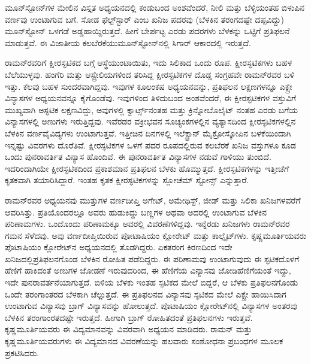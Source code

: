ಮೂನ್‍ಸ್ಟೋನ್‍ಗಳ ಮೇಲಿನ ವಿಸ್ತೃತ ಅಧ್ಯಯನದಲ್ಲಿ ಕಂಡುಬಂದ ಅಂಶವೆಂದರೆ, ನೀಲಿ ಮತ್ತು ಬೆಳ್ಳಿಯಂತಹ ಬಿಳುಪಿನ ವರ್ಣವು ಉಂಟಾಗುವ ಬಗೆ. ಸೋಡ ಫೆಲ್ಟ್‌ಸ್ಟಾರ್ ಎಂಬ ಖನಿಜ ಪದರವು (ಬೆಳಕಿನ ತರಂಗದಷ್ಟೇ ದಪ್ಪವಿದ್ದು) ಮೂನ್‍ಸ್ಟೋನ್ ಒಳಗಡೆ ಅಡ್ಡಹಾಯ್ದಿರುತ್ತದೆ. ಹೀಗೆ ಬೇರ್ಪಟ್ಟ ಎರಡು ಪದರಗಳು ಬೆಳಕನ್ನು ಒಟ್ಟಿಗೆ ಪ್ರತಿಫಲನೆ ಮಾಡುತ್ತವೆ. ಈ ವಿಜಾತೀಯ ಕಲಬೆರಕೆಯು\break ಮೂನ್‍ಸ್ಟೋನ್‍ನಲ್ಲಿ ಸಿಗಾರ್ ಆಕಾರದಲ್ಲಿ ಇರುತ್ತದೆ.

ರಾಮನ್‍ರವರಿಗೆ ಕ್ಷೀರಸ್ಫಟಿಕದ ಬಗ್ಗೆ ಆಸ್ಥೆಯುಂಟಾಯಿತು, ಇದು ಸಿಲಿಕಾದ ಒಂದು ರೂಪ. ಕ್ಷೀರಸ್ಫಟಿಕಗಳು ಬಹಳ ಬೆಲೆಯುಳ್ಳವು. ಹಂಗೆರಿ ಮತ್ತು ಆಸ್ಟ್ರೇಲಿಯಗಳಿಂದ ತರಿಸಿದ್ದ ಕ್ಷೀರಸ್ಫಟಿಕಗಳ ದೊಡ್ಡ ಸಂಗ್ರಹವೇ ರಾಮನ್‍ರವರ ಬಳಿ ಇತ್ತು. ಕೆಲವು ಬಹಳ ಸುಂದರವಾಗಿದ್ದವು. ಇವುಗಳ ಕೂಲಂಕಷ ಅಧ್ಯಯನವನ್ನು, ಪ್ರತಿಫಲನ ಲಕ್ಷಣಗಳನ್ನೂ ಎಕ್ಸ್ರೇ ವಿನ್ಯಾಸಗಳ ಅಧ್ಯಯನವನ್ನೂ ಕೈಗೊಂಡೆವು. ಇವುಗಳಿಂದ ತಿಳಿದುಬಂದ ಅಂಶವೆಂದರೆ, ಈ ಕ್ಷೀರಸ್ಫಟಿಕಗಳ ವಸ್ತುವಿಗೆ ಮುಖ್ಯವಾಗಿ ಅಸ್ಫಟಿಕ ಲಕ್ಷಣವಿದ್ದು, ಅವುಗಳಲ್ಲಿ ಕ್ವಾರ್ಟ್ಸ್‌ನಂತಹ ಮತ್ತು ಕ್ರಿನ್ನೋಬೊಲೈಟ್ ನಂತಹ ಎರಡು ಬಗೆಯ ವಿನ್ಯಾಸಗಳಲ್ಲಿ ಅಣುಗಳು ಇರುತ್ತಿದ್ದವು. ಇವೆರಡರ ವಕ್ರೀಭವನ ಸೂಚ್ಯಂಕಗಳಲ್ಲಿನ ವ್ಯತ್ಯಾಸದಿಂದ ಕ್ಷೀರಸ್ಫಟಿಕಗಳಲ್ಲಿನ ಬೆಳಕಿನ ವರ್ಣವೈವಿದ್ಯಗಳು ಉಂಟಾಗುತ್ತವೆ. ಇತ್ತೀಚಿನ ದಿನಗಳಲ್ಲಿ ಇಲೆಕ್ಟ್ರಾನ್ ಮೈಕ್ರೋಸ್ಕೋಪಿನ ಬಳಕೆಯಿಂದಾಗಿ ಇನ್ನಷ್ಟು ವಿವರಗಳು ದೊರೆತಿವೆ. ಕ್ಷೀರಸ್ಫಟಿಕಗಳ ಒಳಗೆ ಪದರ ರೂಪದಲ್ಲಿರುವ ಕಲಬೆರಕೆ ಖನಿಜ ವಸ್ತುಗಳೂ ಕೂಡ ಒಂದು ಪುನರಾವರ್ತಿತ ವಿನ್ಯಾಸ ಹೊಂದಿವೆ. ಈ ಪುನರಾವರ್ತಿತ ವಿನ್ಯಾಸಗಳ ನಡುವೆ ಗಾಳಿಯು ತುಂಬಿದೆ. ಇದರಿಂದಾಗಿಯೇ ಕ್ಷೀರಸ್ಫಟಿಕದಿಂದ ಪ್ರಕಾಶಮಾನ ಪ್ರತಿಫಲನ ಬೆಳಕು ಹೊಮ್ಮುತ್ತದೆ. ಕ್ಷೀರಸ್ಫಟಿಕಗಳನ್ನು ಇತ್ತೀಚೆಗೆ ಕೃತಕವಾಗಿ ತಯಾರಿಸಿದ್ದಾರೆ. ಇಂತಹ ಕೃತಕ ಕ್ಷೀರಸ್ಫಟಿಕಗಳನ್ನು ಸ್ಲೋಚೆಮ್ ಸ್ಟೋನ್ಸ್  ಎನ್ನುತ್ತಾರೆ.

ರಾಮನ್‍ರವರ ಅಧ್ಯಯನವು ಮುತ್ತುಗಳ ವರ್ಣದೀಪ್ತಿ ಅಗೇಟ್, ಅಮೇಥಿಸ್ಟ್, ಜೀಡ್ ಮತ್ತು ಸಿಲಿಕಾ ಖನಿಜಗಳವರೆಗೆ ಆವರಿಸಿತ್ತು. ಪ್ರತಿಯೊಂದರಲ್ಲೂ ಅವರು ಹುಡುಕಿದ್ದು ಬಣ್ಣಗಳ ಅಥವಾ ಅದರಲ್ಲಿ ಉಂಟಾಗುವ ಬೆಳಕಿನ ಪರಿಣಾಮಗಳು. ಒಂದೊಂದು ಪರಿಣಾಮಕ್ಕೂ ಅವರಲ್ಲಿ ವಿವರಣೆಗಳಿದ್ದವು. ಇನ್ನೆರಡು ಖನಿಜಗಳು ರಾಮನ್‍ರವರ ಗಮನ ಸೆಳೆದವು. ಅವು ವರ್ಣದೀಪ್ತಿ\-ಯಿರುವ ಪೋಟಾಷಿಯಂ ಕ್ಲೋರೇಟ್ ಮತ್ತು ಕಾಲ್ಸೈಟ್‍ಗಳು. ಕೃಷ್ಣಮೂರ್ತಿಯವರು ಪೊಟಾಷಿಯಂ ಕ್ಲೋರೇಟ್‍ನ ಅಧ್ಯಯನದಲ್ಲಿ ತೊಡಗಿದ್ದರು. ಏಕತರಂಗ ಕಿರಣದಿಂದ ಇದೇ ಖನಿಜದಲ್ಲಿ\break ಪ್ರತಿಫಲನಗೊಂಡ ಬೆಳಕಿನ ರೋಹಿತ ಪಡೆದಿದ್ದರು. ಈ ಪರಿಣಾಮವು ಉಂಟಾಗುವುದು ಈ ಸ್ಫಟಿಕದೊಳಗೆ ಹೆಣಿಗೆ ಹಾಕಿದಂತೆ ಅಣುಗಳ ಜೋಡಣೆ ಇರುವುದರಿಂದ, ಈ ಹೆಣಿಗೆಯ ವಿನ್ಯಾಸವು ಜೋಡಿಹೆಣಿಗೆಯಂತೆ ಇದ್ದು, ಇದೇ ಪುನರಾವರ್ತನೆಯಾಗುತ್ತದೆ. ಬಿಳಿಯ ಬೆಳಕು ಇಂತಹ ಸ್ಫಟಿಕದ ಮೇಲೆ ಬಿದ್ದರೆ, ಆ ಬೆಳಕು ಪ್ರತಿಫಲನಗೊಂಡು ಒಂದೇ ತರಂಗಾಂತರದ ಬೆಳಕಾಗಿ ಚೆಲ್ಲುತ್ತದೆ. ಈ ಪ್ರತಿಫಲನದ ವಿನ್ಯಾಸವು ಸ್ಫಟಿಕದ ಮೇಲೆ ಎಕ್ಸ್ರೇ ಹಾಯಿಸಿದಾಗ ಉಂಟಾಗುವ ವಿನ್ಯಾಸವು ಬ್ರಾಗ್ ವಿನ್ಯಾಸವನ್ನು ಹೋಲುತ್ತದೆ. ಪೊಟಾಷಿಯಂ ಕ್ಲೋರೇಟ್‍ನಲ್ಲಿ ವಿನ್ಯಾಸಗಳ ಅಂತರವು ಬೆಳಕಿನ ತರಂಗಾಂರತದಷ್ಟೇ ಇರುತ್ತದೆ. ಹೀಗಾಗಿ ಬ್ರಾಗ್ ರೋಹಿತದಂತೆ ಪ್ರತಿಫಲನಗಳು ಇರುತ್ತವೆ. ಕೃಷ್ಣಮೂರ್ತಿಯವರು ಈ ವಿದ್ಯಮಾನವನ್ನು ವಿವರವಾಗಿ ಅಧ್ಯಯನ ಮಾಡಿದರು. ರಾಮನ್ ಮತ್ತು ಕೃಷ್ಣಮೂರ್ತಿಯವರುಗಳು ಈ ವಿದ್ಯಮಾನದ ವಿವರಣೆಯನ್ನು ಹಲವಾರು ಸಂಶೋಧನಾ ಪ್ರಬಂಧಗಳ ಮೂಲಕ ಪ್ರಕಟಿಸಿದರು.

\newpage

